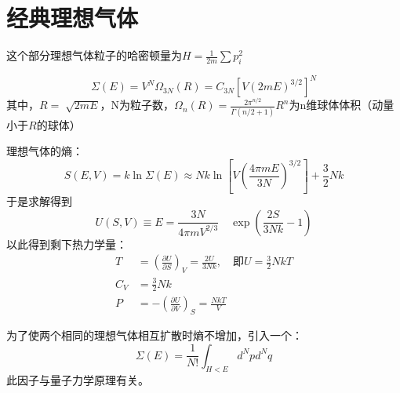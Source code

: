 \documentclass[12pt, a4paper, oneside]{ctexbook}
\newcommand{\hl}[1]{\hlbox{#1}}
\newcounter{#2}
\newcounter{#2}[#1]
\numberwithin{#2}{#1}
\newcommand{\akuo}[1]{\left[#1\right]}
\begin{document}
          \section{经典理想气体}
          \begin{claim}
            这个部分理想气体粒子的哈密顿量为\(H=\frac1{2m}\sum p_i^2\)
          \end{claim}
          \begin{deduce}
            \begin{equation}
              \Sigma(E)=V^N\Omega_{3N}(R)=C_{3N}\akuo{V(2mE)^{3/2}}^N
            \end{equation}
            其中，\(R=\sqrt[]{2mE}\)，N为粒子数，\(\Omega_n(R)=\frac{2\pi^{n/2}}{\Gamma(n/2+1)}R^n\)为n维球体体积（动量小于\(R\)的球体）
          \end{deduce}
          \begin{deduce}
            理想气体的熵：
            \begin{equation}
              S(E,V)=k\ln\Sigma(E)\approx N k \ln \left[V\left(\frac{4 \pi m E}{3 N}\right)^{3 / 2}\right]+\frac{3}{2} N k
            \end{equation}
            于是求解得到
            \begin{equation}
              U(S, V) \equiv E=\frac{3 N}{4 \pi m V^{2 / 3}} \quad \exp \left(\frac{2 S}{3 N k}-1\right)
            \end{equation}
            以此得到剩下热力学量：
            \begin{align}
              T & =\left(\frac{\partial U}{\partial S}\right)_V=\frac{2 U}{3 N k}, \quad\text{即} U=\frac{3}{2} N k T \\
              C_V & =\frac{3}{2} N k \\
              P & =-\left(\frac{\partial U}{\partial V}\right)_S=\frac{N k T}{V}
              \end{align}
          \end{deduce}
          \begin{define}
            为了使两个相同的理想气体相互扩散时熵不增加，引入一个\hl{吉布斯因子}：
            \begin{equation}
              \Sigma(E)=\frac1{N!}\int_{H<E}d^Npd^Nq
            \end{equation}
            此因子与量子力学原理有关。
          \end{define}
\end{document}
